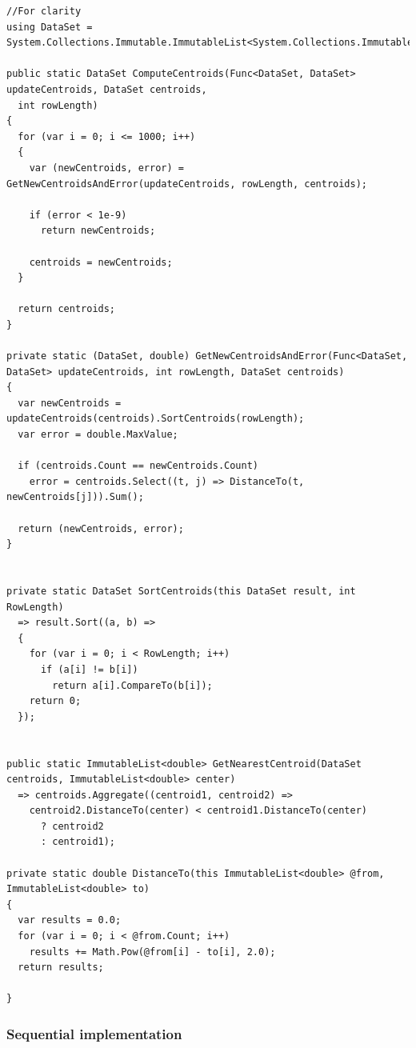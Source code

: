 \begin{lstlisting}[style=sharpcstyle, caption={K-means centroid computation}, label={lst:KMeans},
numbers=none, xleftmargin=0pt,framexleftmargin=0pt,framexrightmargin=0pt,framexbottommargin=0pt]
//For clarity
using DataSet = System.Collections.Immutable.ImmutableList<System.Collections.Immutable.ImmutableList<double>>;

public static DataSet ComputeCentroids(Func<DataSet, DataSet> updateCentroids, DataSet centroids,
  int rowLength)
{
  for (var i = 0; i <= 1000; i++)
  {
    var (newCentroids, error) = GetNewCentroidsAndError(updateCentroids, rowLength, centroids);

    if (error < 1e-9)
      return newCentroids;
    
    centroids = newCentroids;
  }

  return centroids;
}

private static (DataSet, double) GetNewCentroidsAndError(Func<DataSet, DataSet> updateCentroids, int rowLength, DataSet centroids)
{
  var newCentroids = updateCentroids(centroids).SortCentroids(rowLength);
  var error = double.MaxValue;

  if (centroids.Count == newCentroids.Count)
    error = centroids.Select((t, j) => DistanceTo(t, newCentroids[j])).Sum();

  return (newCentroids, error);
}


private static DataSet SortCentroids(this DataSet result, int RowLength)
  => result.Sort((a, b) =>
  {
    for (var i = 0; i < RowLength; i++)
      if (a[i] != b[i])
        return a[i].CompareTo(b[i]);
    return 0;
  });


public static ImmutableList<double> GetNearestCentroid(DataSet centroids, ImmutableList<double> center) 
  => centroids.Aggregate((centroid1, centroid2) => 
    centroid2.DistanceTo(center) < centroid1.DistanceTo(center)
      ? centroid2
      : centroid1);

private static double DistanceTo(this ImmutableList<double> @from, ImmutableList<double> to)
{
  var results = 0.0;
  for (var i = 0; i < @from.Count; i++)
    results += Math.Pow(@from[i] - to[i], 2.0);
  return results;

}
\end{lstlisting}

\subsubsection{Sequential implementation}

